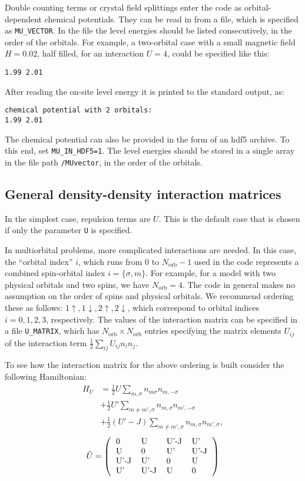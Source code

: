 \documentclass[aps,prb,floatfix,superscriptaddress,twocolumn,notitlepage]{revtex4-1}
\begin{document}
Double counting terms or crystal field splittings enter the code as orbital-dependent chemical potentials. They can be read in from a file, which is specified as \verb#MU_VECTOR#. In the file the level energies should be listed consecutively, in the order of the orbitals. For example, a two-orbital case with a small magnetic field $H=0.02$, half filled, for an interaction $U=4$, could be specified like this:
\begin{verbatim}
1.99 2.01
\end{verbatim}
After reading the on-site level energy it is printed to the standard output, as:
\begin{verbatim}
chemical potential with 2 orbitals: 
1.99 2.01 
\end{verbatim}
The chemical potential can also be provided in the form of an hdf5 archive. To this end, set \verb#MU_IN_HDF5=1#. The level energies should be stored in a single array in the file path \verb#/MUvector#, in the order of the orbitals.

\subsection{General density-density interaction matrices}
\label{umatrix}
In the simplest case, repulsion terms are $U$. This is the default case that is chosen if only the parameter \verb#U# is specified.

In multiorbital problems, more complicated interactions are needed.
In this case, the ``orbital index'' $i$, which runs from $0$ to $N_{\text{orb}}-1$ used in the code represents a combined spin-orbital index $i=\{\sigma,m\}$. For example, for a model with two physical orbitals and two spins, we have $N_{\text{orb}}=4$.
The code in general makes no assumption on the order of spins and physical orbitals. 
We recommend ordering these as follows: $1\uparrow, 1\downarrow, 2\uparrow, 2\downarrow$, which correspond to orbital indices $i=0,1,2,3$, respectively.
The values of the interaction matrix can be specified in a file \verb#U_MATRIX#, which has $N_\text{orb}\times N_\text{orb}$ entries specifying the matrix elements $U_{ij}$ of the interaction term $\frac{1}{2}\sum_{ij}U_{ij}n_i n_j$.

To see how the interaction matrix for the above ordering is built consider the following Hamiltonian:
\begin{align}
H_{U} &=\frac{1}{2}U\sum_{m,\sigma} n_{m\sigma}n_{m,-\sigma} \\ \nonumber &+ \frac{1}{2}U'\sum_{m\neq m',\sigma}n_{m,\sigma}n_{m',-\sigma}
\\ \nonumber&+ \frac{1}{2}(U'-J)\sum_{m\neq m',\sigma} n_{m,\sigma}n_{m',\sigma}, 
\end{align}
\begin{equation}
\hat{U}=\left(\begin{tabular}{llll}
0 & U & U'-J & U'\\
U & 0 & U' & U'-J\\
U'-J & U' & 0 & U\\
U' & U'-J & U & 0\\
\end{tabular}\right)
\end{equation}
\end{document}
